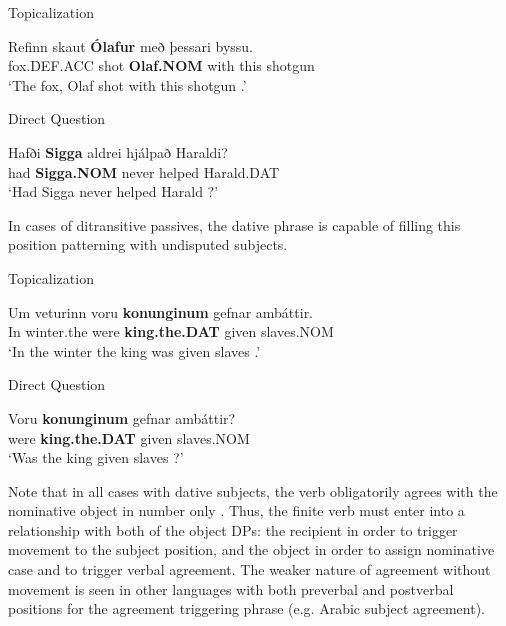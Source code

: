 {\begin{exe}
\ex Topicalization
\begin{xlist}
	\ex \gll Refinn skaut \textbf{Ólafur} með  þessari byssu.\\
	fox.DEF.ACC shot \textbf{Olaf.NOM} with this shotgun\\
\trans `The fox, Olaf shot with this shotgun \citep[ex. 19a]{Zaenen.1985}.'
\end{xlist}
\ex Direct Question
\begin{xlist}
	\ex \gll Hafði \textbf{Sigga} aldrei hjálpað Haraldi?\\
	had \textbf{Sigga.NOM} never helped Harald.DAT\\
\trans `Had Sigga never helped Harald \citep[ex. 20b]{Zaenen.1985}?'
\end{xlist}
\end{exe}

In cases of ditransitive passives, the dative phrase is capable of filling this position patterning with undisputed subjects.

\begin{exe}
\ex Topicalization
\begin{xlist}
	\ex \gll Um veturinn voru \textbf{konunginum} gefnar amb\'{a}ttir.\\
In winter.the were \textbf{king.the.DAT} given slaves.NOM\\
\trans `In the winter the king was given slaves \citep[ex. 47a]{Zaenen.1985}.'
\end{xlist}
\ex Direct Question
\begin{xlist}
	\ex \gll Voru \textbf{konunginum} gefnar amb\'{a}ttir?\\
were \textbf{king.the.DAT} given slaves.NOM\\
\trans `Was the king given slaves \citep[ex. 48a]{Zaenen.1985}?'
\end{xlist}
\end{exe}

Note that in all cases with dative subjects, the verb obligatorily agrees with the nominative object in number only \citep{Arnadottir.2013}. Thus, the finite verb must enter into a relationship with both of the object DPs: the recipient in order to trigger movement to the subject position, and the object in order to assign nominative case and to trigger verbal agreement. The weaker nature of agreement without movement is seen in other languages with both preverbal and postverbal positions for the agreement triggering phrase (e.g. Arabic subject agreement).

}
